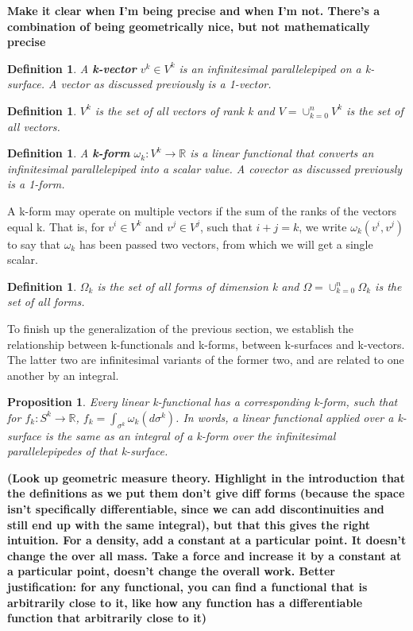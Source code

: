 \documentclass{book}
\newtheorem{defn}[equation]{Definition}
\newtheorem{prop}[equation]{Proposition}
\begin{document}
\textbf{Make it clear when I'm being precise and when I'm not. There's a combination of being geometrically nice, but not mathematically precise}

\begin{defn}
	A \textbf{k-vector} $v^k \in V^k$ is an infinitesimal parallelepiped on a k-surface. A vector as discussed previously is a 1-vector. 
\end{defn}


\begin{defn}
	$V^k$ is the set of all vectors of rank k and $V = \cup_{k=0}^n V^k$ is the set of all vectors. 
	\end{defn}
 

\begin{defn}
	A \textbf{k-form} $\omega_k : V^k \to \mathbb{R}$ is a linear functional that converts an infinitesimal parallelepiped into a scalar value. A covector as discussed previously is a 1-form. 
\end{defn}

A k-form may operate on multiple vectors if the sum of the ranks of the vectors equal k. That is, for $v^i \in V^k$ and $v^j \in V^j$, such that $i + j = k$, we write $\omega_k(v^i, v^j)$ to say that $\omega_k$ has been passed two vectors, from which we will get a single scalar. 


\begin{defn}
	$\Omega_k$ is the set of all forms of dimension k and $\Omega = \cup_{k=0}^n\Omega_k$ is the set of all forms. 
\end{defn}

To finish up the generalization of the previous section, we establish the relationship between k-functionals and k-forms, between k-surfaces and k-vectors. The latter two are infinitesimal variants of the former two, and are related to one another by an integral. 


\begin{prop}
	Every linear k-functional has a corresponding k-form, such that for $f_k : S^k \to \mathbb{R}$, $f_k = \int_{\sigma^k} \omega_k(d\sigma^k)$. In words, a linear functional applied over a k-surface is the same as an integral of a k-form over the infinitesimal parallelepipedes of that k-surface. 
\end{prop}

\textbf{(Look up geometric measure theory. Highlight in the introduction that the definitions as we put them don't give diff forms (because the space isn't specifically differentiable, since we can add discontinuities and still end up with the same integral), but that this gives the right intuition. For a density, add a constant at a particular point. It doesn't change the over all mass. Take a force and increase it by a constant at a particular point, doesn't change the overall work. Better justification: for any functional, you can find a functional that is arbitrarily close to it, like how any function has a differentiable function that arbitrarily close to it)}
\end{document}
